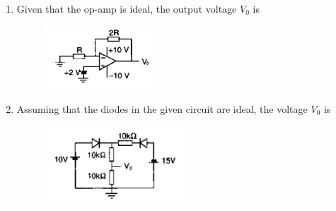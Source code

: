 \documentclass[12pt]{article}
\theoremstyle{remark}
\begin{document}
\begin{enumerate}
\item Given that the op-amp is ideal, the output voltage $V_0$ is
\begin{figure}[H]
    \centering
    \includegraphics[width=0.4\textwidth]{Figs/Q21.png}
    \caption{}
    \label{fig:1.12}
\end{figure}
\begin{enumerate}
\end{enumerate}
\hfill{}

\item Assuming that the diodes in the given circuit are ideal, the voltage $V_0$ is
\begin{figure}[H]
    \centering
    \includegraphics[width=0.5\textwidth]{Figs/Q22.png}
    \caption{}
    \label{fig:1.13}
\end{figure}
\begin{enumerate}
\end{enumerate}
\hfill{}


\end{enumerate}
\end{document}
